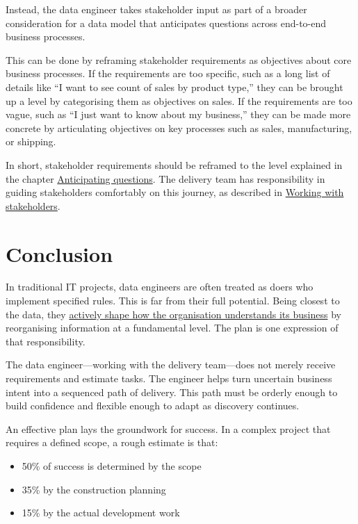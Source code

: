 \documentclass[10pt,openany,10pt]{book}
\providecommand{\tightlist}{%
  \setlength{\itemsep}{0pt}\setlength{\parskip}{0pt}}
\begin{document}
Instead, the data engineer takes stakeholder input as part of a broader
consideration for a data model that anticipates questions across
end-to-end business processes.

This can be done by reframing stakeholder requirements as objectives
about core business processes. If the requirements are too specific,
such as a long list of details like ``I want to see count of sales by
product type,'' they can be brought up a level by categorising them as
objectives on sales. If the requirements are too vague, such as ``I just
want to know about my business,'' they can be made more concrete by
articulating objectives on key processes such as sales, manufacturing,
or shipping.

In short, stakeholder requirements should be reframed to the level
explained in the chapter
\href{/docs/modelling-reality/anticipating-questions/}{Anticipating
questions}. The delivery team has responsibility in guiding stakeholders
comfortably on this journey, as described in
\hyperref[docs-judgement-under-ambiguity-working-with-stakeholders]{Working
with stakeholders}.

\section{Conclusion}\label{conclusion-7}

In traditional IT projects, data engineers are often treated as doers
who implement specified rules. This is far from their full potential.
Being closest to the data, they
\hyperref[docs-foundations-data-and-organisations]{actively shape how
the organisation understands its business} by reorganising information
at a fundamental level. The plan is one expression of that
responsibility.

The data engineer---working with the delivery team---does not merely
receive requirements and estimate tasks. The engineer helps turn
uncertain business intent into a sequenced path of delivery. This path
must be orderly enough to build confidence and flexible enough to adapt
as discovery continues.

An effective plan lays the groundwork for success. In a complex project
that requires a defined scope, a rough estimate is that:

\begin{itemize}
\tightlist
\item
  50\% of success is determined by the scope
\item
  35\% by the construction planning
\item
  15\% by the actual development work
\end{itemize}
\end{document}
